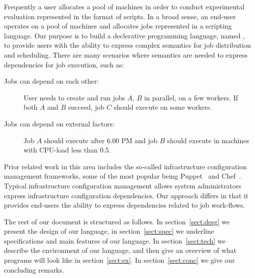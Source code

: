 
Frequently a user allocates a pool of machines in order to conduct experimental
evaluation represented in the format of scripts. In a broad sense, an end-user
operates on a pool of machines and allocates jobs represented in a scripting
language.
Our purpose is to build a declerative programming language, named \lang{},
to provide users with the ability to express complex semantics for job
distribution
and scheduling.
There are many scenarios where semantics are needed to express dependencies for
job execution, such as:
\begin{description}
\item[Jobs can depend on each other:] User needs to create and run jobs $A$,
$B$ in parallel, on a few workers. If both $A$ and $B$ succeed, job $C$ should
execute on some workers.
\item[Jobs can depend on external factors:] Job $A$ should execute after 6.00 PM
and job $B$ should execute in machines with CPU-load less than 0.5.
\end{description}

Prior related work in this area includes the so-called infrastructure
configuration management frameworks, some of the most popular being
Puppet~\cite{puppet} and Chef~\cite{chef}. Typical infrastructure
configuration management allows system administrators express
infrastructure configuration dependencies. Our approach differs in that
it provides end-users the ability to express dependencies related to
job work-flows.

The rest of our document is structured as follows. In section~\ref{sect:desg} we
present the design of our language, in section~\ref{sect:spec} we underline
specifications and main features of our language. In section~\ref{sect:tech} we
describe the environment of our language, and then give an overview of what
programs will look like in section~\ref{sect:ex}. In section~\ref{sect:conc} we
give our concluding remarks.


